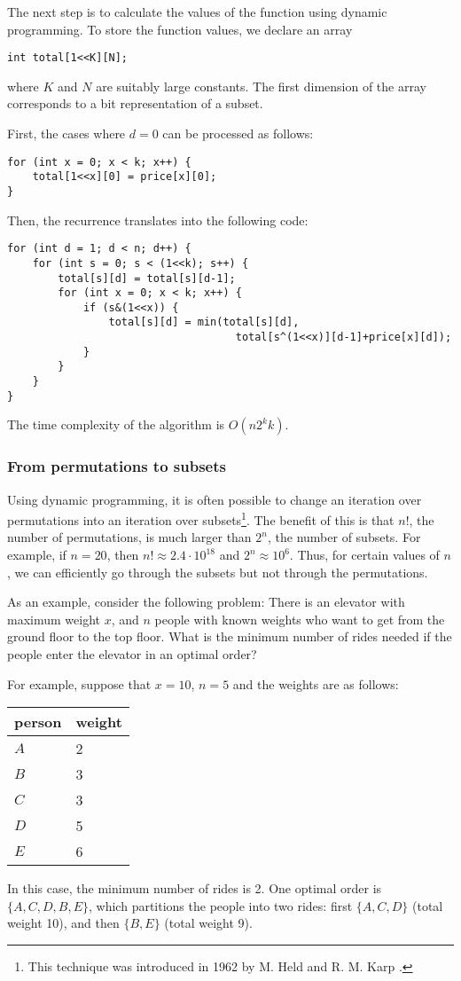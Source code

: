 The next step is to calculate the values of the function
using dynamic programming.
To store the function values, we declare an array
\begin{lstlisting}
int total[1<<K][N];
\end{lstlisting}
where $K$ and $N$ are suitably large constants.
The first dimension of the array corresponds to a bit
representation of a subset.

First, the cases where $d=0$ can be processed as follows:
\begin{lstlisting}
for (int x = 0; x < k; x++) {
    total[1<<x][0] = price[x][0];
}
\end{lstlisting}
Then, the recurrence translates into the following code:
\begin{lstlisting}
for (int d = 1; d < n; d++) {
    for (int s = 0; s < (1<<k); s++) {
        total[s][d] = total[s][d-1];
        for (int x = 0; x < k; x++) {
            if (s&(1<<x)) {
                total[s][d] = min(total[s][d],
                                    total[s^(1<<x)][d-1]+price[x][d]);
            }
        }
    }
}
\end{lstlisting}
The time complexity of the algorithm is $O(n 2^k k)$.

\subsubsection{From permutations to subsets}

Using dynamic programming, it is often possible
to change an iteration over permutations into
an iteration over subsets\footnote{This technique was introduced in 1962
by M. Held and R. M. Karp \cite{hel62}.}.
The benefit of this is that
$n!$, the number of permutations,
is much larger than $2^n$, the number of subsets.
For example, if $n=20$, then
$n! \approx 2.4 \cdot 10^{18}$ and $2^n \approx 10^6$.
Thus, for certain values of $n$,
we can efficiently go through the subsets but not through the permutations.

As an example, consider the following problem:
There is an elevator with maximum weight $x$,
and $n$ people with known weights
who want to get from the ground floor
to the top floor.
What is the minimum number of rides needed
if the people enter the elevator in an optimal order?

For example, suppose that $x=10$, $n=5$
and the weights are as follows:
\begin{center}
\begin{tabular}{ll}
person & weight \\
\hline
$A$ & 2 \\
$B$ & 3 \\
$C$ & 3 \\
$D$ & 5 \\
$E$ & 6 \\
\end{tabular}
\end{center}
In this case, the minimum number of rides is 2.
One optimal order is $\{A,C,D,B,E\}$,
which partitions the people into two rides:
first $\{A,C,D\}$ (total weight 10),
and then $\{B,E\}$ (total weight 9).

